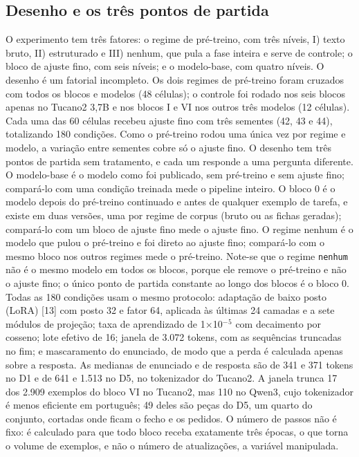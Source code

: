 \documentclass{IOS-Book-Article}
\begin{document}
\subsection{Desenho e os três pontos de partida}
O experimento tem três fatores: o regime de pré-treino, com três níveis, I) texto bruto, II) estruturado e III) nenhum, que pula a fase inteira e serve de controle; o bloco de ajuste fino, com seis níveis; e o modelo-base, com quatro níveis. O desenho é um fatorial incompleto. Os dois regimes de pré-treino foram cruzados com todos os blocos e modelos (48 células); o controle foi rodado nos seis blocos apenas no Tucano2 3,7B e nos blocos I e VI nos outros três modelos (12 células). Cada uma das 60 células recebeu ajuste fino com três sementes (42, 43 e 44), totalizando 180 condições. Como o pré-treino rodou uma única vez por regime e modelo, a variação entre sementes cobre só o ajuste fino.
O desenho tem três pontos de partida sem tratamento, e cada um responde a uma pergunta diferente. O modelo-base é o modelo como foi publicado, sem pré-treino e sem ajuste fino; compará-lo com uma condição treinada mede o pipeline inteiro. O bloco 0 é o modelo depois do pré-treino continuado e antes de qualquer exemplo de tarefa, e existe em duas versões, uma por regime de corpus (bruto ou as fichas geradas); compará-lo com um bloco de ajuste fino mede o ajuste fino. O regime nenhum é o modelo que pulou o pré-treino e foi direto ao ajuste fino; compará-lo com o mesmo bloco nos outros regimes mede o pré-treino. Note-se que o regime \texttt{nenhum} não é o mesmo modelo em todos os blocos, porque ele remove o pré-treino e não o ajuste fino; o único ponto de partida constante ao longo dos blocos é o bloco 0.
Todas as 180 condições usam o mesmo protocolo: adaptação de baixo posto (LoRA) [13] com posto 32 e fator 64, aplicada às últimas 24 camadas e a sete módulos de projeção; taxa de aprendizado de 1$\times$10$^{-}$$^{5}$ com decaimento por cosseno; lote efetivo de 16; janela de 3.072 tokens, com as sequências truncadas no fim; e mascaramento do enunciado, de modo que a perda é calculada apenas sobre a resposta. As medianas de enunciado e de resposta são de 341 e 371 tokens no D1 e de 641 e 1.513 no D5, no tokenizador do Tucano2. A janela trunca 17 dos 2.909 exemplos do bloco VI no Tucano2, mas 110 no Qwen3, cujo tokenizador é menos eficiente em português; 49 deles são peças do D5, um quarto do conjunto, cortadas onde ficam o fecho e os pedidos. O número de passos não é fixo: é calculado para que todo bloco receba exatamente três épocas, o que torna o volume de exemplos, e não o número de atualizações, a variável manipulada.
\end{document}

